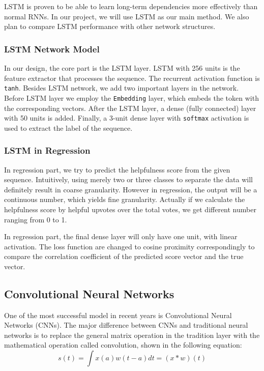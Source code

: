 \documentclass[11pt]{article}
\begin{document}
LSTM is proven to be able to learn long-term dependencies more effectively than normal RNNs. In our project, we will use LSTM as our main method. We also plan to compare LSTM performance with other network structures.

\subsubsection{LSTM Network Model}

In our design, the core part is the LSTM layer. LSTM with 256 units is the feature extractor that processes the sequence. The recurrent activation function is \texttt{tanh}.  Besides LSTM network, we add two important layers in the network. Before LSTM layer we employ the \texttt{Embedding} layer, which embeds the token with the corresponding vectors. After the LSTM layer, a dense (fully connected) layer with 50 units is added. Finally, a 3-unit dense layer with \texttt{softmax} activation is used to extract the label of the sequence.

\subsubsection{LSTM in Regression}

In regression part, we try to predict the helpfulness score from the given sequence. Intuitively, using merely two or three classes to separate the data will definitely result in coarse granularity. However in regression, the output will be a continuous number, which yields fine granularity.  Actually if we calculate the helpfulness score by helpful upvotes over the total votes, we get different number ranging from 0 to 1. 

In regression part, the final dense layer will only have one unit, with linear activation. The loss function are changed to cosine proximity correspondingly to compare the correlation coefficient of the predicted score vector and the true vector.

\subsection{Convolutional Neural Networks}
One of the most successful model in recent years is Convolutional Neural Networks (CNNs). The major difference between CNNs and traditional neural networks is to replace the general matrix operation in the tradition layer with the mathematical operation called convolution, shown in the following equation:
\[s(t)=\int x(a)w(t-a)dt = (x * w)(t)\]
\end{document}

